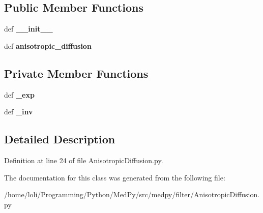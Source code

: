 \subsection*{Public Member Functions}
\begin{DoxyCompactItemize}
\item 
\hypertarget{classmedpy_1_1filter_1_1AnisotropicDiffusion_1_1AnisotropicDiffusion_a44c36411bf89fa4363f8530fd1c95e08}{
def {\bfseries \_\-\_\-init\_\-\_\-}}
\label{classmedpy_1_1filter_1_1AnisotropicDiffusion_1_1AnisotropicDiffusion_a44c36411bf89fa4363f8530fd1c95e08}

\item 
\hypertarget{classmedpy_1_1filter_1_1AnisotropicDiffusion_1_1AnisotropicDiffusion_a0570346712d774d5924136d2db5b1900}{
def {\bfseries anisotropic\_\-diffusion}}
\label{classmedpy_1_1filter_1_1AnisotropicDiffusion_1_1AnisotropicDiffusion_a0570346712d774d5924136d2db5b1900}

\end{DoxyCompactItemize}
\subsection*{Private Member Functions}
\begin{DoxyCompactItemize}
\item 
\hypertarget{classmedpy_1_1filter_1_1AnisotropicDiffusion_1_1AnisotropicDiffusion_a0a2c56db669341daae9ea878599dd935}{
def {\bfseries \_\-exp}}
\label{classmedpy_1_1filter_1_1AnisotropicDiffusion_1_1AnisotropicDiffusion_a0a2c56db669341daae9ea878599dd935}

\item 
\hypertarget{classmedpy_1_1filter_1_1AnisotropicDiffusion_1_1AnisotropicDiffusion_a6240b8045db1061c340212a50c454ff3}{
def {\bfseries \_\-inv}}
\label{classmedpy_1_1filter_1_1AnisotropicDiffusion_1_1AnisotropicDiffusion_a6240b8045db1061c340212a50c454ff3}

\end{DoxyCompactItemize}


\subsection{Detailed Description}


Definition at line 24 of file AnisotropicDiffusion.py.



The documentation for this class was generated from the following file:\begin{DoxyCompactItemize}
\item 
/home/loli/Programming/Python/MedPy/src/medpy/filter/AnisotropicDiffusion.py\end{DoxyCompactItemize}
